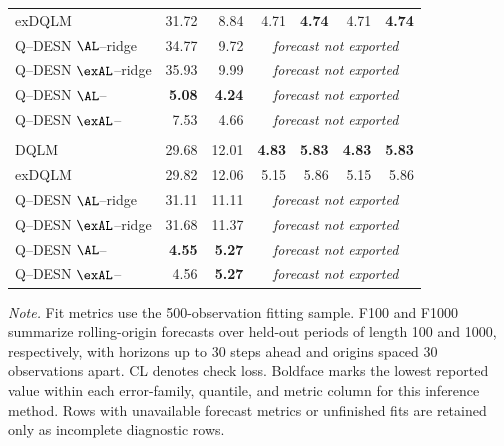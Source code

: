 \begin{longtable}{@{}lrrrrrr@{}}
exDQLM & 31.72 & 8.84 & 4.71 & \textbf{4.74} & 4.71 & \textbf{4.74} \\
Q--DESN \(\AL\)--ridge & 34.77 & 9.72 & \multicolumn{4}{c}{\emph{forecast not exported}} \\
Q--DESN \(\exAL\)--ridge & 35.93 & 9.99 & \multicolumn{4}{c}{\emph{forecast not exported}} \\
Q--DESN \(\AL\)--\RHS{} & \textbf{5.08} & \textbf{4.24} & \multicolumn{4}{c}{\emph{forecast not exported}} \\
Q--DESN \(\exAL\)--\RHS{} & 7.53 & 4.66 & \multicolumn{4}{c}{\emph{forecast not exported}} \\
\addlinespace[0.25em]
\multicolumn{7}{@{}l}{\emph{Gaussian mixture errors, $\tau = 0.50$}}\\
DQLM & 29.68 & 12.01 & \textbf{4.83} & \textbf{5.83} & \textbf{4.83} & \textbf{5.83} \\
exDQLM & 29.82 & 12.06 & 5.15 & 5.86 & 5.15 & 5.86 \\
Q--DESN \(\AL\)--ridge & 31.11 & 11.11 & \multicolumn{4}{c}{\emph{forecast not exported}} \\
Q--DESN \(\exAL\)--ridge & 31.68 & 11.37 & \multicolumn{4}{c}{\emph{forecast not exported}} \\
Q--DESN \(\AL\)--\RHS{} & \textbf{4.55} & \textbf{5.27} & \multicolumn{4}{c}{\emph{forecast not exported}} \\
Q--DESN \(\exAL\)--\RHS{} & 4.56 & \textbf{5.27} & \multicolumn{4}{c}{\emph{forecast not exported}} \\
\end{longtable}
\par\noindent\begin{minipage}{0.97\textwidth}\footnotesize
\emph{Note.} Fit metrics use the 500-observation fitting sample. F100 and F1000 summarize rolling-origin forecasts over held-out periods of length 100 and 1000, respectively, with horizons up to 30 steps ahead and origins spaced 30 observations apart. CL denotes check loss. Boldface marks the lowest reported value within each error-family, quantile, and metric column for this inference method. Rows with unavailable forecast metrics or unfinished fits are retained only as incomplete diagnostic rows.
\end{minipage}
\par\endgroup

